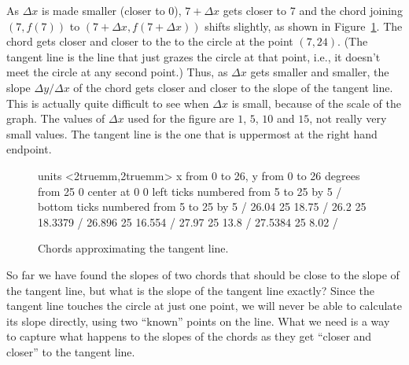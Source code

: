 As $\Delta x$ is made smaller (closer to 0), $7+\Delta x$ gets closer to 7 and the chord joining
$(7,f(7))$ to $(7+\Delta x,f(7+\Delta x))$ shifts slightly, as shown
 in Figure~\ref{fig:chords}. The chord
gets closer and closer to the  
to the circle at the point $(7,24)$.  (The
tangent line is the line that just grazes the circle at that point,
i.e., it doesn't meet the circle at any second point.)  Thus, as
$\Delta x$ gets smaller and smaller, the slope $\Delta y/\Delta x$ of
the chord gets closer and closer to the slope of the tangent line.
This is actually quite difficult to see when $\Delta x$ is small,
because of the scale of the graph. The values of $\Delta x$ used for
the figure are $1$, $5$, $10$ and $15$, not really very small values.
The tangent line is the one that is uppermost at the right hand
endpoint.

\smallskip
\begin{figure}[!ht]
\centerline{\beginpicture
\normalgraphs
\setcoordinatesystem units <2truemm,2truemm>
\setplotarea x from 0 to 26, y from 0 to 26
 degrees from 25 0 center at 0 0
\axis left ticks numbered from 5 to 25 by 5 /
\axis bottom ticks numbered from 5 to 25 by 5 /
 26.04 25 18.75 /
 26.2 25 18.3379 /
 26.896 25 16.554 /
 27.97 25 13.8 /
 27.5384 25 8.02 /
\endpicture}
\caption{Chords approximating the tangent line. \label{fig:chords}}
\end{figure}

So far we have found the slopes of two chords that should be close to
the slope of the tangent line, but what is the slope of the tangent
line exactly? Since the tangent line touches the circle at just one
point, we will never be able to calculate its slope directly, using
two ``known'' points on the line. What we need is a way to capture
what happens to the slopes of the chords as they get ``closer and
closer'' to the tangent line.

